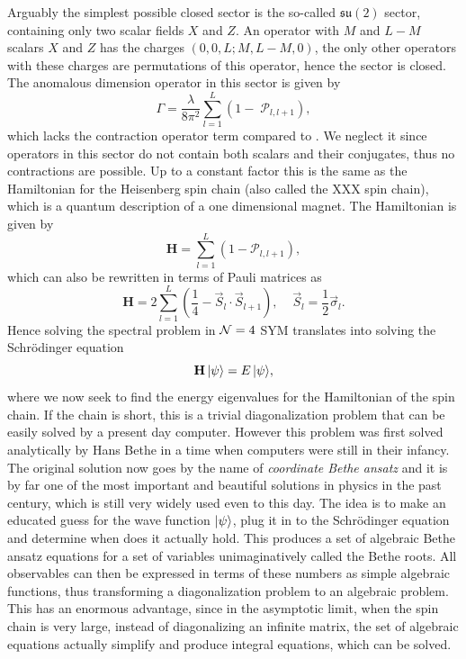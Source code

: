 Arguably the simplest possible closed sector is the so-called $\mathfrak{su}(2)$ sector, containing only two scalar fields $X$ and $Z$. 
An operator with $M$ and $L-M$ scalars $X$ and $Z$ has the charges $(0, 0, L; M, L-M, 0)$, the only other operators with these charges are permutations of this operator, hence the sector is closed. 
The anomalous dimension operator in this sector is given by
\begin{equation}
	\Gamma = \frac{\lambda}{8\pi^2}\sum_{l=1}^L \left(1 - \; \mathcal{P}_{l,l+1} \right),
\end{equation}
which lacks the contraction operator term compared to . 
We neglect it since operators in this sector do not contain both scalars and their conjugates, thus no contractions are possible.
Up to a constant factor this is the same as the Hamiltonian for the Heisenberg spin chain (also called the XXX spin chain), which is a quantum description of a one dimensional magnet. 
The Hamiltonian is given by
\begin{equation}
	\mathbf{H} = \sum_{l=1}^L \left(1 - \mathcal{P}_{l,l+1} \right),
\end{equation}
which can also be rewritten in terms of Pauli matrices as
\begin{equation}
	\mathbf{H} = 2 \sum_{l=1}^L \left( \frac{1}{4} - \vec{S}_l \cdot \vec{S}_{l+1} \right), \;\;\;\; \vec{S}_l = \frac{1}{2} \vec{\sigma}_l.
\end{equation}
Hence solving the spectral problem in $\mathcal{N}=4$ SYM translates into solving the Schr\"{o}dinger equation
\begin{equation}
	\mathbf{H} \, |\psi\rangle = E \, |\psi\rangle,
	\label{eq:Schrodinger}
\end{equation}
where we now seek to find the energy eigenvalues for the Hamiltonian of the spin chain. 
If the chain is short, this is a trivial diagonalization problem that can be easily solved by a present day computer. 
However this problem was first solved analytically by Hans Bethe in a time when computers were still in their infancy. 
The original solution now goes by the name of \emph{coordinate Bethe ansatz} and it is by far one of the most important and beautiful solutions in physics in the past century, which is still very widely used even to this day. 
The idea is to make an educated guess for the wave function $|\psi\rangle$, plug it in to the Schr\"{o}dinger equation and determine when does it actually hold. 
This produces a set of algebraic Bethe ansatz equations for a set of variables unimaginatively called the Bethe roots. 
All observables can then be expressed in terms of these numbers as simple algebraic functions, thus transforming a diagonalization problem to an algebraic problem. 
This has an enormous advantage, since in the asymptotic limit, when the spin chain is very large, instead of diagonalizing an infinite matrix, the set of algebraic equations actually simplify and produce integral equations, which can be solved.

